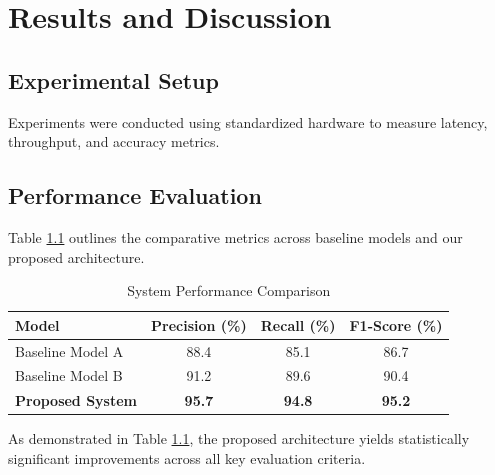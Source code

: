 \chapter{Results and Discussion}
\label{ch:results}

\section{Experimental Setup}
Experiments were conducted using standardized hardware to measure latency, throughput, and accuracy metrics.

\section{Performance Evaluation}
Table \ref{tab:comparison} outlines the comparative metrics across baseline models and our proposed architecture.

\begin{table}[htbp]
\centering
\caption{System Performance Comparison}
\label{tab:comparison}
\begin{tabular}{lccc}
\toprule
\textbf{Model} & \textbf{Precision (\%)} & \textbf{Recall (\%)} & \textbf{F1-Score (\%)} \\
\midrule
Baseline Model A & 88.4 & 85.1 & 86.7 \\
Baseline Model B & 91.2 & 89.6 & 90.4 \\
\textbf{Proposed System} & \textbf{95.7} & \textbf{94.8} & \textbf{95.2} \\
\bottomrule
\end{tabular}
\end{table}

As demonstrated in Table \ref{tab:comparison}, the proposed architecture yields statistically significant improvements across all key evaluation criteria.
